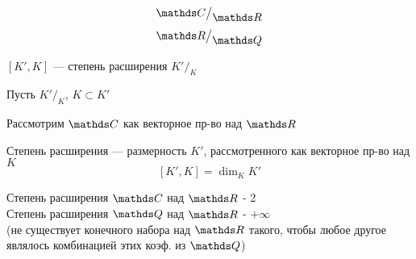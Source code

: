 \documentclass[main.tex]{subfiles}
\begin{document}
        \begin{Example}
            \[\CC\big/_{\displaystyle \R}\]
            \[\R\big/_{\displaystyle \Q}\]
        \end{Example}

        \begin{definition}
            $[K', K]$ --- степень расширения $K'\big/_{\displaystyle K}$
        \end{definition}

        Пусть $K'\big/_{\displaystyle K}$, $K \subset K'$

        Рассмотрим $\CC$ как векторное пр-во над $\R$

        \begin{remark}
            Степень расширения --- размерность $K'$, рассмотренного как векторное пр-во над $K$
            \[[K',K] = \dim_K K'\]
        \end{remark}

        \begin{example}
            Степень расширения $\CC$ над $\R$ - 2\\
            Степень расширения $\Q$ над $\R$ - $+\infty$ \\
            (не существует конечного набора над $\R$
            такого, чтобы любое другое являлось комбинацией этих коэф. из $\Q$)
        \end{example}
\end{document}
